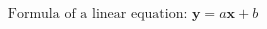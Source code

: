 \documentclass[12pt]{standalone}
\begin{document}
	\begin{varwidth}{50in}
		\begin{equation*}
		\textrm{Formula of a linear equation: } \mathbf{y} = \mathit{a} \mathbf{x} + \mathit{b}				
		\end{equation*}
	\end{varwidth}
\end{document}
